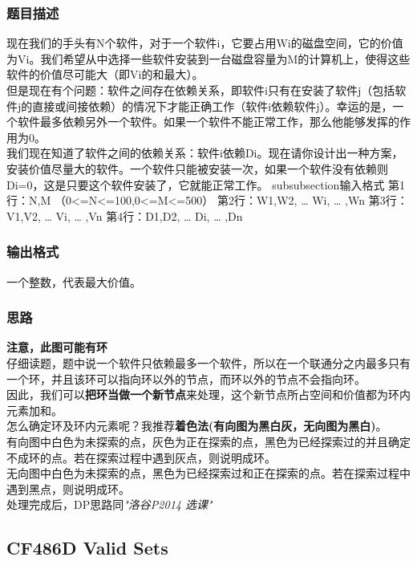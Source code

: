     \subsubsection{题目描述}
        现在我们的手头有N个软件，对于一个软件i，它要占用Wi的磁盘空间，它的价值为Vi。我们希望从中选择一些软件安装到一台磁盘容量为M的计算机上，使得这些软件的价值尽可能大（即Vi的和最大）。\\
        但是现在有个问题：软件之间存在依赖关系，即软件i只有在安装了软件j（包括软件j的直接或间接依赖）的情况下才能正确工作（软件i依赖软件j）。幸运的是，一个软件最多依赖另外一个软件。如果一个软件不能正常工作，那么他能够发挥的作用为0。\\
        我们现在知道了软件之间的依赖关系：软件i依赖Di。现在请你设计出一种方案，安装价值尽量大的软件。一个软件只能被安装一次，如果一个软件没有依赖则Di=0，这是只要这个软件安装了，它就能正常工作。
    subsubsection{输入格式}
        第1行：N,M （0<=N<=100,0<=M<=500）
        第2行：W1,W2, … Wi, … ,Wn
        第3行：V1,V2, … Vi, … ,Vn
        第4行：D1,D2, … Di, … ,Dn
    \subsubsection{输出格式}
        一个整数，代表最大价值。
    \subsubsection{思路}
        \textbf{注意，此图可能有环}\\
        仔细读题，题中说一个软件只依赖最多一个软件，所以在一个联通分之内最多只有一个环，并且该环可以指向环以外的节点，而环以外的节点不会指向环。\\
        因此，我们可以\textbf{把环当做一个新节点}来处理，这个新节点所占空间和价值都为环内元素加和。\\
        怎么确定环及环内元素呢？我推荐\textbf{着色法(有向图为黑白灰，无向图为黑白)}。\\
        有向图中白色为未探索的点，灰色为正在探索的点，黑色为已经探索过的并且确定不成环的点。若在探索过程中遇到灰点，则说明成环。\\
        无向图中白色为未探索的点，黑色为已经探索过和正在探索的点。若在探索过程中遇到黑点，则说明成环。\\
        处理完成后，DP思路同\textit{"洛谷P2014 选课"}

\subsection{CF486D Valid Sets}
